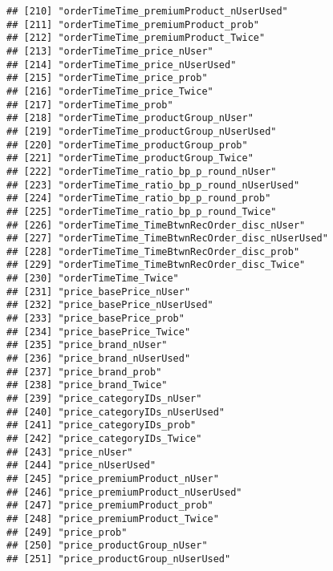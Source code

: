 \documentclass[10pt]{report}
\begin{document}
\begin{verbatim}
## [210] "orderTimeTime_premiumProduct_nUserUsed"             
## [211] "orderTimeTime_premiumProduct_prob"                  
## [212] "orderTimeTime_premiumProduct_Twice"                 
## [213] "orderTimeTime_price_nUser"                          
## [214] "orderTimeTime_price_nUserUsed"                      
## [215] "orderTimeTime_price_prob"                           
## [216] "orderTimeTime_price_Twice"                          
## [217] "orderTimeTime_prob"                                 
## [218] "orderTimeTime_productGroup_nUser"                   
## [219] "orderTimeTime_productGroup_nUserUsed"               
## [220] "orderTimeTime_productGroup_prob"                    
## [221] "orderTimeTime_productGroup_Twice"                   
## [222] "orderTimeTime_ratio_bp_p_round_nUser"               
## [223] "orderTimeTime_ratio_bp_p_round_nUserUsed"           
## [224] "orderTimeTime_ratio_bp_p_round_prob"                
## [225] "orderTimeTime_ratio_bp_p_round_Twice"               
## [226] "orderTimeTime_TimeBtwnRecOrder_disc_nUser"          
## [227] "orderTimeTime_TimeBtwnRecOrder_disc_nUserUsed"      
## [228] "orderTimeTime_TimeBtwnRecOrder_disc_prob"           
## [229] "orderTimeTime_TimeBtwnRecOrder_disc_Twice"          
## [230] "orderTimeTime_Twice"                                
## [231] "price_basePrice_nUser"                              
## [232] "price_basePrice_nUserUsed"                          
## [233] "price_basePrice_prob"                               
## [234] "price_basePrice_Twice"                              
## [235] "price_brand_nUser"                                  
## [236] "price_brand_nUserUsed"                              
## [237] "price_brand_prob"                                   
## [238] "price_brand_Twice"                                  
## [239] "price_categoryIDs_nUser"                            
## [240] "price_categoryIDs_nUserUsed"                        
## [241] "price_categoryIDs_prob"                             
## [242] "price_categoryIDs_Twice"                            
## [243] "price_nUser"                                        
## [244] "price_nUserUsed"                                    
## [245] "price_premiumProduct_nUser"                         
## [246] "price_premiumProduct_nUserUsed"                     
## [247] "price_premiumProduct_prob"                          
## [248] "price_premiumProduct_Twice"                         
## [249] "price_prob"                                         
## [250] "price_productGroup_nUser"                           
## [251] "price_productGroup_nUserUsed"                       

\end{verbatim}
\end{document}
